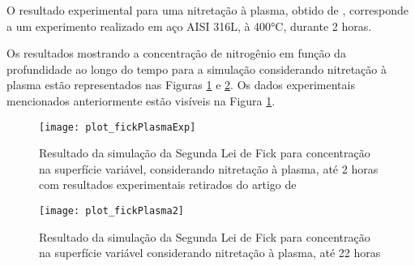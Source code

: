 O resultado experimental para uma nitretação à plasma, obtido de \cite{moskalioviene2011modeling}, corresponde a um experimento realizado em aço AISI 316L, à 400°C, durante 2 horas.

Os resultados mostrando a concentração de nitrogênio em função da profundidade ao longo do tempo para a simulação considerando nitretação à plasma estão representados nas Figuras \ref{fig:csvar-plasma1} e \ref{fig:csvar-plasma2}. Os dados experimentais mencionados anteriormente estão visíveis na Figura \ref{fig:csvar-plasma1}.


\begin{figure}[!htb]
\centering
	\caption{Resultado da simulação da Segunda Lei de Fick para concentração na superfície variável, considerando nitretação à plasma, até 2 horas com resultados experimentais retirados do artigo de \cite{moskalioviene2011modeling}}
	\texttt{[image: plot\_fickPlasmaExp]}
	\label{fig:csvar-plasma1}
	\centering
\end{figure}

\begin{figure}[!htb]
\centering
	\caption{Resultado da simulação da Segunda Lei de Fick para concentração na superfície variável considerando nitretação à plasma, até 22 horas}
	\texttt{[image: plot\_fickPlasma2]}
	\label{fig:csvar-plasma2}
	\centering
\end{figure}

\FloatBarrier